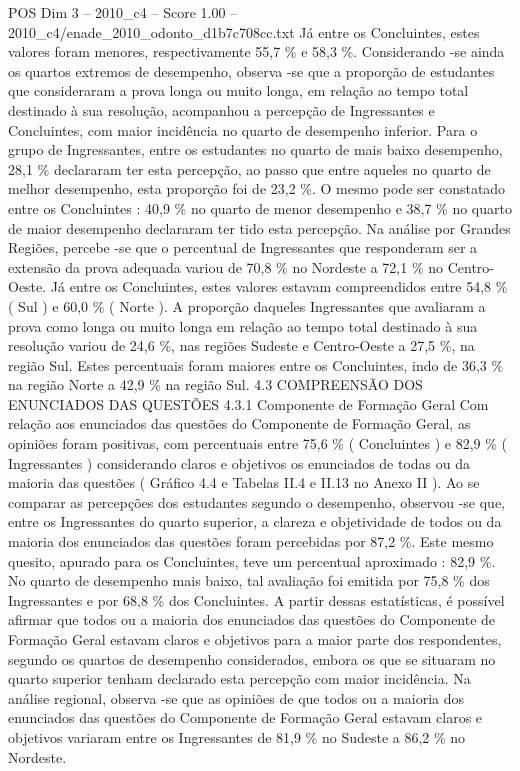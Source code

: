 \begin{textsample}{POS Dim 3 – 2010\_c4 – Score 1.00 – 2010\_c4/enade\_2010\_odonto\_d1b7c708cc.txt}
Já entre os Concluintes, estes valores foram menores, respectivamente 55,7 \% e 58,3 \%.
Considerando -se ainda os quartos extremos de desempenho, observa -se que a proporção de estudantes que consideraram a prova longa ou muito longa, em relação ao tempo total destinado à sua resolução, acompanhou a percepção de Ingressantes e Concluintes, com maior incidência no quarto de desempenho inferior.
Para o grupo de Ingressantes, entre os estudantes no quarto de mais baixo desempenho, 28,1 \% declararam ter esta percepção, ao passo que entre aqueles no quarto de melhor desempenho, esta proporção foi de 23,2 \%.
O mesmo pode ser constatado entre os Concluintes : 40,9 \% no quarto de menor desempenho e 38,7 \% no quarto de maior desempenho declararam ter tido esta percepção.
Na análise por Grandes Regiões, percebe -se que o percentual de Ingressantes que responderam ser a extensão da prova adequada variou de 70,8 \% no Nordeste a 72,1 \% no Centro-Oeste.
Já entre os Concluintes, estes valores estavam compreendidos entre 54,8 \% ( Sul ) e 60,0 \% ( Norte ).
A proporção daqueles Ingressantes que avaliaram a prova como longa ou muito longa em relação ao tempo total destinado à sua resolução variou de 24,6 \%, nas regiões Sudeste e Centro-Oeste a 27,5 \%, na região Sul.
Estes percentuais foram maiores entre os Concluintes, indo de 36,3 \% na região Norte a 42,9 \% na região Sul. 4.3 COMPREENSÃO DOS ENUNCIADOS DAS QUESTÕES 4.3.1 Componente de Formação Geral Com relação aos enunciados das questões do Componente de Formação Geral, as opiniões foram positivas, com percentuais entre 75,6 \% ( Concluintes ) e 82,9 \% ( Ingressantes ) considerando claros e objetivos os enunciados de todas ou da maioria das questões ( Gráfico 4.4 e Tabelas II.4 e II.13 no Anexo II ).
Ao se comparar as percepções dos estudantes segundo o desempenho, observou -se que, entre os Ingressantes do quarto superior, a clareza e objetividade de todos ou da maioria dos enunciados das questões foram percebidas por 87,2 \%.
Este mesmo quesito, apurado para os Concluintes, teve um percentual aproximado : 82,9 \%.
No quarto de desempenho mais baixo, tal avaliação foi emitida por 75,8 \% dos Ingressantes e por 68,8 \% dos Concluintes.
A partir dessas estatísticas, é possível afirmar que todos ou a maioria dos enunciados das questões do Componente de Formação Geral estavam claros e objetivos para a maior parte dos respondentes, segundo os quartos de desempenho considerados, embora os que se situaram no quarto superior tenham declarado esta percepção com maior incidência.
Na análise regional, observa -se que as opiniões de que todos ou a maioria dos enunciados das questões do Componente de Formação Geral estavam claros e objetivos variaram entre os Ingressantes de 81,9 \% no Sudeste a 86,2 \% no Nordeste.

\end{textsample}

